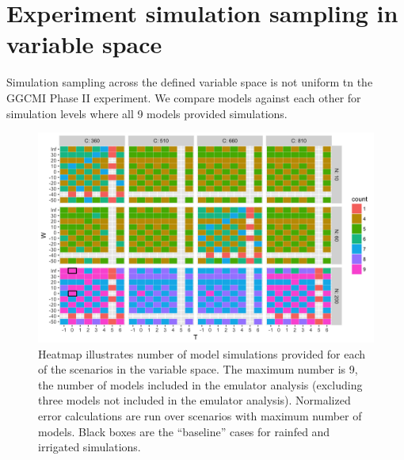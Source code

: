 \documentclass[12pt]{article}
\begin{document}
{\scriptsize \tableofcontents}

\clearpage

\renewcommand{\thefigure}{S\arabic{figure}}

\section{Experiment simulation sampling in variable space}
\begin{flushleft}
Simulation sampling across the defined variable space is not uniform tn the GGCMI Phase II experiment. We compare models against each other for simulation levels where all 9 models provided simulations. 
\end{flushleft}

\begin{figure}[h!]
  \centering
  \includegraphics[width=\textwidth]{s_how_many_simulations.png}
  \caption{
  Heatmap illustrates number of model simulations provided for each of the scenarios in the variable space. 
  The maximum number is 9, the number of models included in the emulator analysis (excluding three models not included in the emulator analysis). 
  Normalized error calculations are run over scenarios with maximum number of models.
  Black boxes are the ``baseline'' cases for rainfed and irrigated simulations.
  }
  \label{fig:numbersims}
\end{figure}

\clearpage
\end{document}
